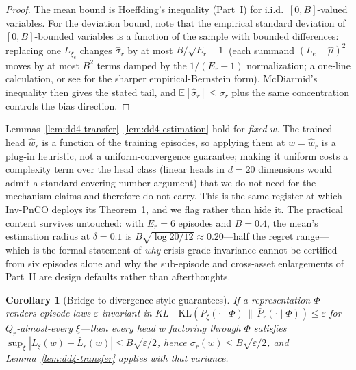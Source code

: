 \documentclass[11pt,a4paper]{article}
\theoremstyle{definition}
\theoremstyle{plain}
\newtheorem{corollary}{Corollary}[section]
\newcommand{\E}{\mathbb{E}}
\newcommand{\KL}{\mathrm{KL}}
\begin{document}
\begin{proof}
The mean bound is Hoeffding's inequality (Part~I) for i.i.d.\
$[0, B]$-valued variables. For the deviation bound, note that the
empirical standard deviation of $[0,B]$-bounded variables is a function
of the sample with bounded differences: replacing one $L_{\xi_e}$ changes
$\hat\sigma_r$ by at most $B / \sqrt{E_r - 1}$ (each summand
$(L_e - \hat\mu)^2$ moves by at most $B^2$ terms damped by the
$1/(E_r{-}1)$ normalization; a one-line calculation, or see
\cite{maurer2009empirical} for the sharper empirical-Bernstein form).
McDiarmid's inequality then gives the stated tail, and
$\E[\hat\sigma_r] \le \sigma_r$ plus the same concentration controls the
bias direction.
\end{proof}

\begin{warning}[title={Important: the plug-in caveat}]
Lemmas~\ref{lem:dd4-transfer}--\ref{lem:dd4-estimation} hold for
\emph{fixed} $w$. The trained head $\hat w_r$ is a function of the
training episodes, so applying them at $w = \hat w_r$ is a plug-in
heuristic, not a uniform-convergence guarantee; making it uniform costs
a complexity term over the head class (linear heads in $d = 20$
dimensions would admit a standard covering-number argument) that we do
not need for the mechanism claims and therefore do not carry. This is
the same register at which Inv-PnCO deploys its Theorem~1, and we flag
rather than hide it. The practical content survives untouched: with
$E_r = 6$ episodes and $B = 0.4$, the mean's estimation radius at
$\delta = 0.1$ is $B\sqrt{\log 20 / 12} \approx 0.20$---half the regret
range---which is the formal statement of \emph{why} crisis-grade
invariance cannot be certified from six episodes alone and why the
sub-episode and cross-asset enlargements of Part~II are design defaults
rather than afterthoughts.
\end{warning}

\begin{corollary}[Bridge to divergence-style guarantees]
\label{cor:dd4-bridge}
If a representation $\Phi$ renders episode laws $\varepsilon$-invariant
in KL---$\KL(P_\xi(\cdot \mid \Phi)\, \|\, \bar P_r(\cdot \mid \Phi))
\le \varepsilon$ for $Q_r$-almost-every $\xi$---then every head $w$
factoring through $\Phi$ satisfies
$\sup_\xi |L_\xi(w) - \bar L_r(w)| \le B\sqrt{\varepsilon/2}$, hence
$\sigma_r(w) \le B\sqrt{\varepsilon/2}$, and
Lemma~\ref{lem:dd4-transfer} applies with that variance.
\end{corollary}
\end{document}
